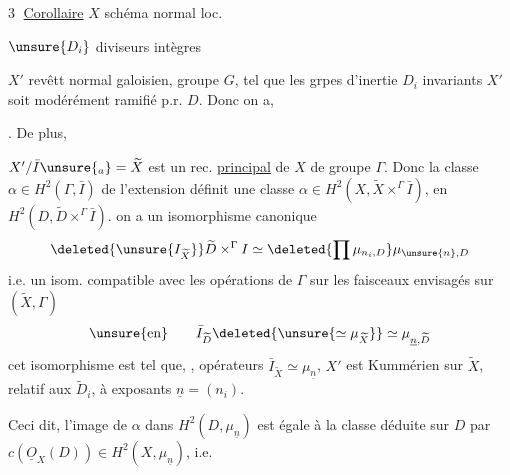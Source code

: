 \textcircled{3} \uline{Corollaire} $X$ schéma normal  loc. 

$\unsure{D_i}$ diviseurs intègres 


$X'$ revêtt  normal galoisien, groupe $G$, tel que les grpes d'inertie  $D_i$  invariants  $X'$ soit modérément ramifié p.r.  $D$. Donc on a, 

. De plus,

$X'/\bar I\unsure{{}_a}=\widetilde X$ est  un rec. \uline{principal} de $X$ de groupe $\Gamma$. Donc la classe $\alpha\in H^2(\Gamma,\bar I)$ de l'extension définit une classe  $\alpha\in H^2(X,\widetilde X\mathbin{\times}^{\Gamma}\bar I)$,  en $H^2(D,\widetilde D\mathbin{\times}^{\Gamma}\bar I)$.  on a un isomorphisme canonique
\[
\deleted{\unsure{I_{\widetilde X}}}\widetilde D\mathbin{\times}^{\Gamma}I
\simeq\deleted{\prod\mu_{n_i,D}}\mu_{\unsure{n},D}
\]
i.e. un isom. compatible avec les opérations de $\Gamma$  sur les faisceaux envisagés sur $(\widetilde X,\Gamma)$
\[
\unsure{\text{en}}\qquad \bar I_{\widetilde D}\deleted{\unsure{\simeq\mu_{\widetilde X}}}\simeq\mu_{\underline n,\widetilde D}
\]
 cet isomorphisme est tel que,  , opérateurs $\bar I_{\widetilde X}\simeq\mu_{\underline n}$, $X'$ est  Kummérien sur $\widetilde X$, relatif aux $\widetilde D_i$, à exposants $\underline n=(n_i)$.

Ceci dit, l'image de $\alpha$ dans $H^2(D,\mu_{\underline n})$ est égale à la classe déduite sur $D$ par $c(\underline{O}_X(D))\in H^2(X,\mu_{\underline n})$, i.e.

